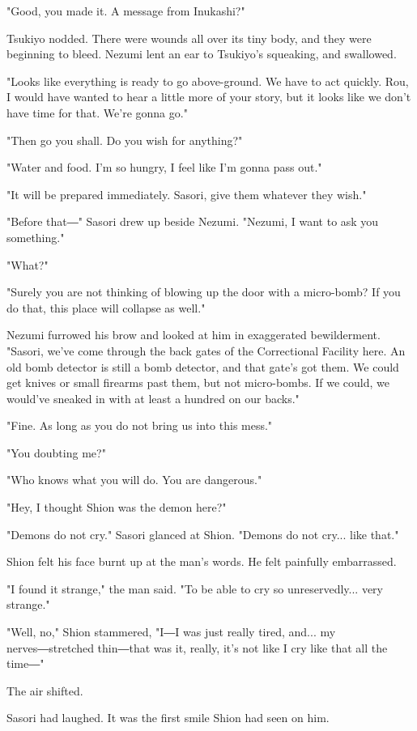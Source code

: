 "Good, you made it. A message from Inukashi?"

Tsukiyo nodded. There were wounds all over its tiny body, and they were
beginning to bleed. Nezumi lent an ear to Tsukiyo's squeaking, and
swallowed.

"Looks like everything is ready to go above-ground. We have to act
quickly. Rou, I would have wanted to hear a little more of your story,
but it looks like we don't have time for that. We're gonna go."

"Then go you shall. Do you wish for anything?"

"Water and food. I'm so hungry, I feel like I'm gonna pass out."

"It will be prepared immediately. Sasori, give them whatever they wish."

"Before that―" Sasori drew up beside Nezumi. "Nezumi, I want to ask you
something."

"What?"

"Surely you are not thinking of blowing up the door with a micro-bomb?
If you do that, this place will collapse as well."

Nezumi furrowed his brow and looked at him in exaggerated bewilderment.
"Sasori, we've come through the back gates of the Correctional Facility
here. An old bomb detector is still a bomb detector, and that gate's got
them. We could get knives or small firearms past them, but not
micro-bombs. If we could, we would've sneaked in with at least a hundred
on our backs."

"Fine. As long as you do not bring us into this mess."

"You doubting me?"

"Who knows what you will do. You are dangerous."

"Hey, I thought Shion was the demon here?"

"Demons do not cry." Sasori glanced at Shion. "Demons do not cry... like
that."

Shion felt his face burnt up at the man's words. He felt painfully
embarrassed.

"I found it strange," the man said. "To be able to cry so
unreservedly... very strange."

"Well, no," Shion stammered, "I―I was just really tired, and... my
nerves―stretched thin―that was it, really, it's not like I cry like that
all the time―"

The air shifted.

Sasori had laughed. It was the first smile Shion had seen on him.

